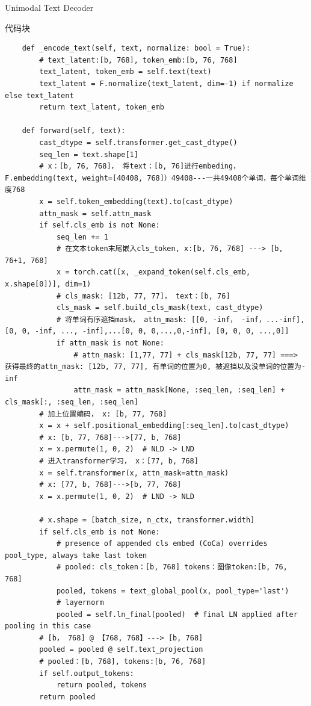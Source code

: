 \documentclass[zihao=false,fontset=windows]{ctexart}
\newcommand{\codehead}{{\small\ttfamily\color{feishuGray}代码块}\par\vspace{-0.15em}}
\begin{document}
Unimodal Text Decoder\par
\begin{feishucode}
\codehead
\begin{lstlisting}
    def _encode_text(self, text, normalize: bool = True):
        # text_latent:[b, 768], token_emb:[b, 76, 768]
        text_latent, token_emb = self.text(text)
        text_latent = F.normalize(text_latent, dim=-1) if normalize else text_latent
        return text_latent, token_emb

    def forward(self, text):
        cast_dtype = self.transformer.get_cast_dtype()
        seq_len = text.shape[1]
        # x：[b, 76, 768]， 将text：[b, 76]进行embeding， F.embedding(text, weight=[40408, 768]）49408---一共49408个单词，每个单词维度768
        x = self.token_embedding(text).to(cast_dtype)
        attn_mask = self.attn_mask
        if self.cls_emb is not None:
            seq_len += 1
            # 在文本token末尾嵌入cls_token, x:[b, 76, 768] ---> [b, 76+1, 768]
            x = torch.cat([x, _expand_token(self.cls_emb, x.shape[0])], dim=1)
            # cls_mask: [12b, 77, 77]， text：[b, 76]
            cls_mask = self.build_cls_mask(text, cast_dtype)
            # 将单词有序遮挡mask， attn_mask: [[0, -inf， -inf，...-inf], [0, 0, -inf, ..., -inf],...[0, 0, 0,...,0,-inf], [0, 0, 0, ...,0]]
            if attn_mask is not None:
                # attn_mask: [1,77, 77] + cls_mask[12b, 77, 77] ===> 获得最终的attn_mask: [12b, 77, 77], 有单词的位置为0, 被遮挡以及没单词的位置为-inf
                attn_mask = attn_mask[None, :seq_len, :seq_len] + cls_mask[:, :seq_len, :seq_len]
        # 加上位置编码， x: [b, 77, 768]
        x = x + self.positional_embedding[:seq_len].to(cast_dtype)
        # x: [b, 77, 768]--->[77, b, 768]
        x = x.permute(1, 0, 2)  # NLD -> LND
        # 进入transformer学习， x：[77, b, 768]
        x = self.transformer(x, attn_mask=attn_mask)
        # x: [77, b, 768]--->[b, 77, 768]
        x = x.permute(1, 0, 2)  # LND -> NLD

        # x.shape = [batch_size, n_ctx, transformer.width]
        if self.cls_emb is not None:
            # presence of appended cls embed (CoCa) overrides pool_type, always take last token
            # pooled: cls_token：[b, 768] tokens：图像token:[b, 76, 768]
            pooled, tokens = text_global_pool(x, pool_type='last')
            # layernorm
            pooled = self.ln_final(pooled)  # final LN applied after pooling in this case
        # [b， 768] @ 【768, 768】---> [b, 768]
        pooled = pooled @ self.text_projection
        # pooled：[b, 768], tokens:[b, 76, 768]
        if self.output_tokens:
            return pooled, tokens
        return pooled
\end{lstlisting}
\end{feishucode}
\end{document}
